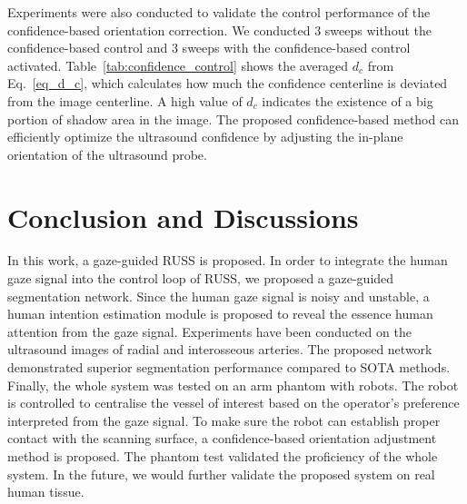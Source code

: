 \par
Experiments were also conducted to validate the control performance of the confidence-based orientation correction. We conducted $3$ sweeps without the confidence-based control and $3$ sweeps with the confidence-based control activated. Table~\ref{tab:confidence_control} shows the averaged $d_c$ from Eq.~\ref{eq_d_c}, which calculates how much the confidence centerline is deviated from the image centerline. A high value of $d_c$ indicates the existence of a big portion of shadow area in the image. The proposed confidence-based method can efficiently optimize the ultrasound confidence by adjusting the in-plane orientation of the ultrasound probe.



\section{Conclusion and Discussions}
In this work, a gaze-guided RUSS is proposed. In order to integrate the human gaze signal into the control loop of RUSS, we proposed a gaze-guided segmentation network. Since the human gaze signal is noisy and unstable, a human intention estimation module is proposed to reveal the essence human attention from the gaze signal. Experiments have been conducted on the ultrasound images of radial and interosseous arteries. The proposed network demonstrated superior segmentation performance compared to SOTA methods.
Finally, the whole system was tested on an arm phantom with robots. The robot is controlled to centralise the vessel of interest based on the operator's preference interpreted from the gaze signal. To make sure the robot can establish proper contact with the scanning surface, a confidence-based orientation adjustment method is proposed. The phantom test validated the proficiency of the whole system. In the future, we would further validate the proposed system on real human tissue.